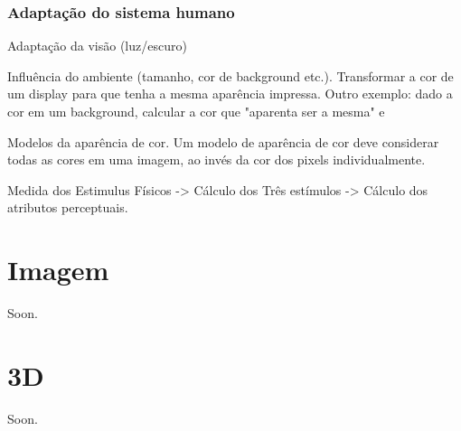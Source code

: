 \documentclass[a4paper,10pt]{report}
\begin{document}
\subsection{Adaptação do sistema humano}
\par
Adaptação da visão (luz/escuro)

\par
Influência do ambiente (tamanho, cor de background etc.). Transformar a
cor de um display para que tenha a mesma aparência impressa. Outro exemplo:
dado a cor em um background, calcular a cor que "aparenta ser a mesma" e

\par
Modelos da aparência de cor. Um modelo de aparência de cor deve considerar
todas as cores em uma imagem, ao invés da cor dos pixels individualmente.

\par
Medida dos Estimulus Físicos -> Cálculo dos Três estímulos -> Cálculo dos
atributos perceptuais.

\chapter{Imagem}
Soon.

\chapter{3D}
Soon.
\end{document}
